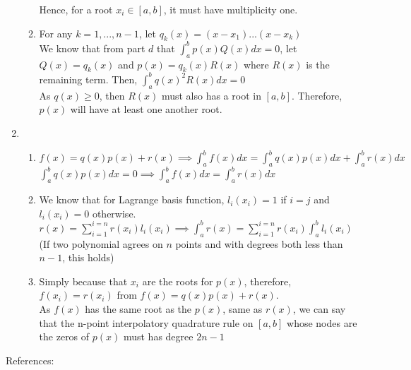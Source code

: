 \documentclass[11pt]{article}
\begin{document}
\begin{solution}
\begin{enumerate}
\begin{enumerate}
            Hence, for a root $x_i \in [a,b]$, it must have multiplicity one.\\
            
            \item For any $k = 1, ..., n-1$, let $q_k(x) = (x - x_1)...(x - x_k)$\\
            
            We know that from part $d$ that $\int_{a}^{b} p(x)Q(x)dx = 0$, let $Q(x) = q_k(x)$ and $p(x) = q_k(x)R(x)$ where $R(x)$ is the remaining term. Then, $\int_{a}^{b} q(x)^2R(x)dx = 0$\\
            
            As $q(x) \geq 0$, then $R(x)$ must also has a root in $[a,b]$. Therefore, $p(x)$ will have at least one another root.\\
        \end{enumerate}
        
    \item  
        \begin{enumerate}
            \item $f(x) = q(x)p(x) + r(x) \implies \int_{a}^{b} f(x)dx = \int_{a}^{b} q(x)p(x)dx + \int_{a}^{b}r(x) dx$ \\
            
            $\int_{a}^{b} q(x)p(x)dx = 0 \implies \int_{a}^{b} f(x)dx = \int_{a}^{b}r(x) dx$\\
            
            \item We know that for Lagrange basis function, $l_i(x_i) = 1$ if $i = j$ and $l_i(x_i) = 0$ otherwise.\\
            
            $r(x) = \sum_{i=1}^{i=n}r(x_i)l_i(x_i) \implies \int_{a}^{b}r(x) = \sum_{i=1}^{i=n}r(x_i)\int_{a}^{b}l_i(x_i)$ (If two polynomial agrees on $n$ points and with degrees both less than $n-1$, this holds)\\
            
            \item Simply because that $x_i$ are the roots for $p(x)$, therefore, $f(x_i) = r(x_i)$ from $f(x) = q(x)p(x) + r(x)$.\\
            As $f(x)$ has the same root as the $p(x)$, same as $r(x)$, we can say that the n-point interpolatory quadrature rule on $[a,b]$ whose nodes are the zeros of $p(x)$ must has degree $2n - 1$
        \end{enumerate}
\end{enumerate}

\end{solution}
References: \\ 
\end{document}
